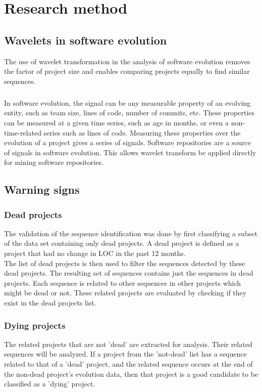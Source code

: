 \chapter{Research method}
\label{method}

\section{Wavelets in software evolution}
The use of wavelet transformation in the analysis of software evolution removes
the factor of project size and enables comparing projects equally to find
similar sequences.

\paragraph{}
In software evolution, the signal can be any measurable property of an evolving
entity, such as team size, lines of code, number of commits, etc.
These properties can be measured at a given time series, such as age in months,
or even a non-time-related series such as lines of code. Measuring these
properties over the evolution of a project gives a series of signals. Software
repositories are a source of signals in software evolution. This allows wavelet
transform be applied directly for mining software repositories.

\section{Warning signs}
\subsection{Dead projects}
The validation of the sequence identification was done by first classifying
a subset of the data set containing only dead projects. A dead project is
defined as a project that had no change in LOC in the past 12 months.\\

The list of dead projects is then used to filter the sequences detected by
these dead projects. The resulting set of sequences contains just the sequences
in dead projects. Each sequence is related to other sequences in other projects
which might be dead or not. These related projects are evaluated by checking if
they exist in the dead projects list.

\subsection{Dying projects}
The related projects that are not 'dead' are extracted for analysis. Their
related sequences will be analyzed. If a project from the 'not-dead' list has a
sequence related to that of a 'dead' project, and the related sequence occurs
at the end of the non-dead project's evolution data, then that project is a
good candidate to be classified as a 'dying' project.\\

